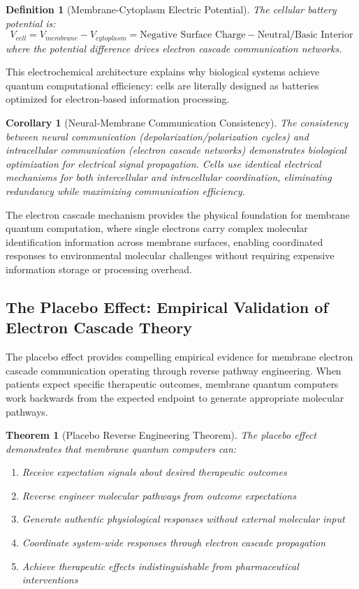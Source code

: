 \documentclass[12pt,a4paper]{article}
\newtheorem{theorem}{Theorem}
\newtheorem{definition}{Definition}
\newtheorem{corollary}{Corollary}
\begin{document}
\begin{definition}[Membrane-Cytoplasm Electric Potential]
The cellular battery potential is:
\begin{equation}
V_{cell} = V_{membrane} - V_{cytoplasm} = \text{Negative Surface Charge} - \text{Neutral/Basic Interior}
\end{equation}
where the potential difference drives electron cascade communication networks.
\end{definition}

This electrochemical architecture explains why biological systems achieve quantum computational efficiency: cells are literally designed as batteries optimized for electron-based information processing.

\begin{corollary}[Neural-Membrane Communication Consistency]
The consistency between neural communication (depolarization/polarization cycles) and intracellular communication (electron cascade networks) demonstrates biological optimization for electrical signal propagation. Cells use identical electrical mechanisms for both intercellular and intracellular coordination, eliminating redundancy while maximizing communication efficiency.
\end{corollary}

The electron cascade mechanism provides the physical foundation for membrane quantum computation, where single electrons carry complex molecular identification information across membrane surfaces, enabling coordinated responses to environmental molecular challenges without requiring expensive information storage or processing overhead.

\subsection{The Placebo Effect: Empirical Validation of Electron Cascade Theory}

The placebo effect provides compelling empirical evidence for membrane electron cascade communication operating through reverse pathway engineering. When patients expect specific therapeutic outcomes, membrane quantum computers work backwards from the expected endpoint to generate appropriate molecular pathways.

\begin{theorem}[Placebo Reverse Engineering Theorem]
The placebo effect demonstrates that membrane quantum computers can:
\begin{enumerate}
\item Receive expectation signals about desired therapeutic outcomes
\item Reverse engineer molecular pathways from outcome expectations
\item Generate authentic physiological responses without external molecular input
\item Coordinate system-wide responses through electron cascade propagation
\item Achieve therapeutic effects indistinguishable from pharmaceutical interventions
\end{enumerate}
\end{theorem}
\end{document}
